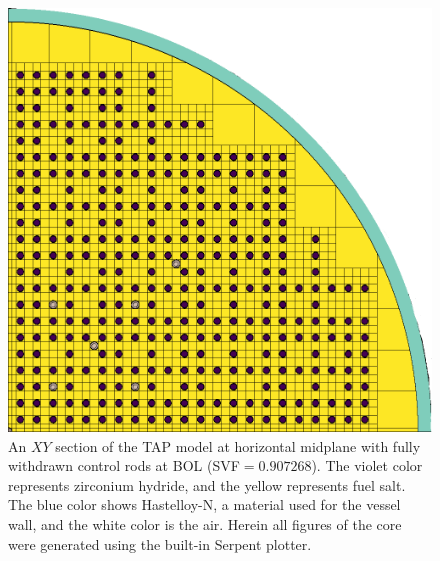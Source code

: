 \documentclass[12pt]{article} %
\begin{document}
\begin{figure}[htp!] %
  \centering
		  \includegraphics[width=\textwidth]{tap_plan_view.png}
  \caption{An $XY$ section of the \gls{TAP} model at horizontal midplane 
  with fully withdrawn control rods at \gls{BOL} (\gls{SVF}$=0.907268$). 
  The violet color represents zirconium 
hydride, and the yellow represents fuel salt. The blue color shows 
Hastelloy-N, a material used for the vessel wall, and the white color 
is the air. Herein all figures of the core 
were generated using the built-in Serpent plotter.}
  \label{fig:tap-serpent-plan}
\end{figure}
\end{document}
